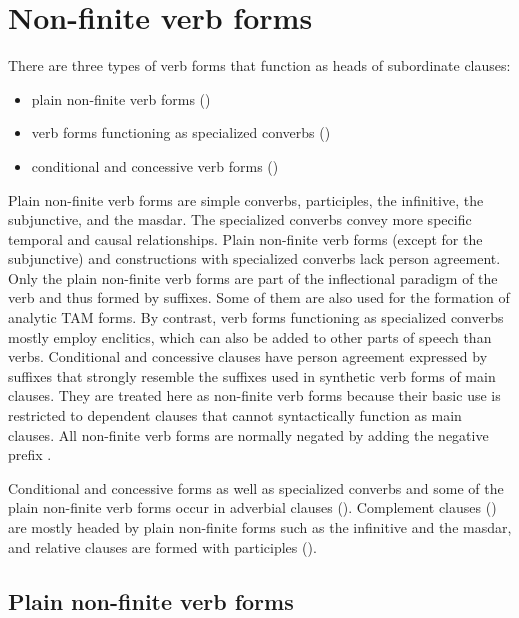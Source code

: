 \chapter{Non-finite verb forms}
\label{cpt:nonfiniteverbforms}

There are three types of verb forms that function as heads of subordinate clauses:
%
\begin{itemize}
	\item	plain non-finite verb forms ()
	\item	verb forms functioning as specialized converbs ()
		\item	conditional and concessive verb forms ()
\end{itemize}

Plain non-finite verb forms are simple converbs, participles, the infinitive, the subjunctive, and the masdar. The specialized converbs convey more specific temporal and causal relationships. Plain non-finite verb forms (except for the subjunctive) and constructions with specialized converbs lack person agreement. Only the plain non-finite verb forms are part of the inflectional paradigm of the verb and thus formed by suffixes. Some of them are also used for the formation of analytic TAM forms. By contrast, verb forms functioning as specialized converbs mostly employ enclitics, which can also be added to other parts of speech than verbs. Conditional and concessive clauses have person agreement expressed by suffixes that strongly resemble the suffixes used in synthetic verb forms of main clauses. They are treated here as non-finite verb forms because their basic use is restricted to dependent clauses that cannot syntactically function as  main clauses. All non-finite verb forms are normally negated by adding the negative prefix .

Conditional and concessive forms as well as specialized converbs and some of the plain non-finite verb forms occur in adverbial clauses (). Complement clauses () are mostly headed by plain non-finite forms such as the infinitive and the masdar, and relative clauses are formed with participles (). 



\section{Plain non-finite verb forms}
\label{sec:Plain non-finite verb forms}

